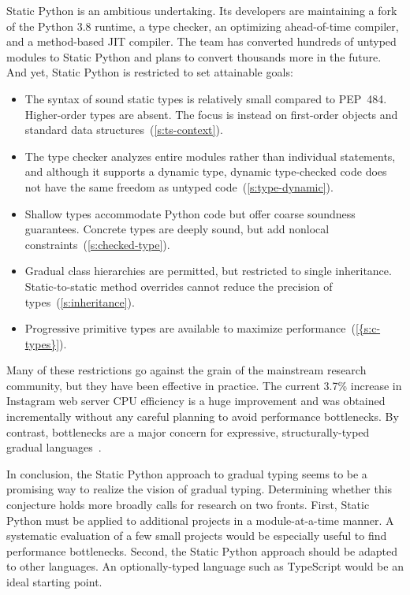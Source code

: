 \documentclass[english,cleveref,submission]{programming}
\newcommand{\SP}{Static Python}
\newcommand{\PEP}{PEP~484}
\newcommand{\CPUchange}{3.7\%}
\begin{document}
\SP{} is an ambitious undertaking.
Its developers are maintaining a fork of the Python 3.8 runtime,
a type checker,
an optimizing ahead-of-time compiler,
and a method-based JIT compiler.
The team has converted hundreds of untyped modules to \SP{}
and plans to convert thousands more in the future.
And yet, \SP{} is restricted to set attainable goals:
\begin{itemize}
  \item
    The syntax of sound static types is relatively small compared
    to \PEP{}.
    Higher-order types are absent.
    The focus is instead on first-order objects and standard data structures~(\cref{s:ts-context}).
  \item
    The type checker analyzes entire modules rather than individual statements,
    and although it supports a dynamic type, dynamic type-checked code
    does not have the same freedom as untyped code~(\cref{s:type-dynamic}).
  \item
    Shallow types accommodate Python code but offer coarse
    soundness guarantees.
    Concrete types are deeply sound, but add nonlocal constraints~(\cref{s:checked-type}).
  \item
    Gradual class hierarchies are permitted, but restricted to single inheritance.
    Static-to-static method overrides cannot reduce the precision of types~(\cref{s:inheritance}).
  \item
    Progressive primitive types are available to maximize performance~(\cref{{s:c-types}}).
\end{itemize}
%
Many of these restrictions go against the grain of the mainstream
research community, but they have been effective in practice.
The current \CPUchange{} increase in Instagram web server CPU efficiency is a huge improvement
and was obtained incrementally without any careful planning to avoid performance bottlenecks.
By contrast, bottlenecks are a major concern for expressive, structurally-typed
gradual languages~\cite{gtnffvf-jfp-2019,tfgnvf-popl-2016}.

In conclusion, the \SP{} approach to gradual typing seems to be a promising
way to realize the vision of gradual typing.
Determining whether this conjecture holds more broadly
calls for research on two fronts.
First, \SP{} must be applied to additional projects in a module-at-a-time manner.
A systematic evaluation of a few small projects would be
especially useful to find performance bottlenecks.
Second, the \SP{} approach should be adapted to other languages.
An optionally-typed language such as TypeScript would be an ideal starting
point.
\end{document}
